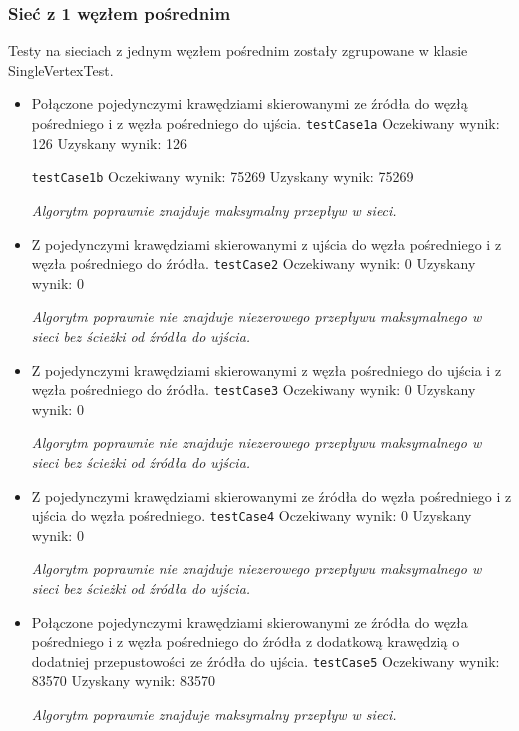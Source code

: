 \subsubsection{Sieć z 1 węzłem pośrednim}
Testy na sieciach z jednym węzłem pośrednim zostały zgrupowane
w klasie SingleVertexTest.
\begin{itemize}[nosep]
    \item Połączone pojedynczymi krawędziami skierowanymi ze źródła do węzłą
    pośredniego i z węzła pośredniego do ujścia.
    \texttt{testCase1a}
    Oczekiwany wynik: 126
    Uzyskany wynik: 126

    \texttt{testCase1b}
    Oczekiwany wynik: 75269
    Uzyskany wynik: 75269

    \emph{Algorytm poprawnie znajduje maksymalny przepływ w sieci.}

    \item Z pojedynczymi krawędziami skierowanymi z ujścia do węzła pośredniego
    i z węzła pośredniego do źródła.
    \texttt{testCase2}
    Oczekiwany wynik: 0
    Uzyskany wynik: 0

    \emph{Algorytm poprawnie nie znajduje niezerowego przepływu maksymalnego w sieci bez ścieżki od źródła do ujścia.}

    \item Z pojedynczymi krawędziami skierowanymi z węzła pośredniego do ujścia
    i z węzła pośredniego do źródła.
    \texttt{testCase3}
    Oczekiwany wynik: 0
    Uzyskany wynik: 0

    \emph{Algorytm poprawnie nie znajduje niezerowego przepływu maksymalnego w sieci bez ścieżki od źródła do ujścia.}

    \item Z pojedynczymi krawędziami skierowanymi ze źródła do węzła pośredniego
    i z ujścia do węzła pośredniego.
    \texttt{testCase4}
    Oczekiwany wynik: 0
    Uzyskany wynik: 0

    \emph{Algorytm poprawnie nie znajduje niezerowego przepływu maksymalnego w sieci bez ścieżki od źródła do ujścia.}

    \item Połączone pojedynczymi krawędziami skierowanymi ze źródła do węzła
    pośredniego i z węzła pośredniego do źródła z dodatkową krawędzią o
    dodatniej przepustowości ze źródła do ujścia.
    \texttt{testCase5}
    Oczekiwany wynik: 83570
    Uzyskany wynik: 83570

    \emph{Algorytm poprawnie znajduje maksymalny przepływ w sieci.}


\end{itemize}
